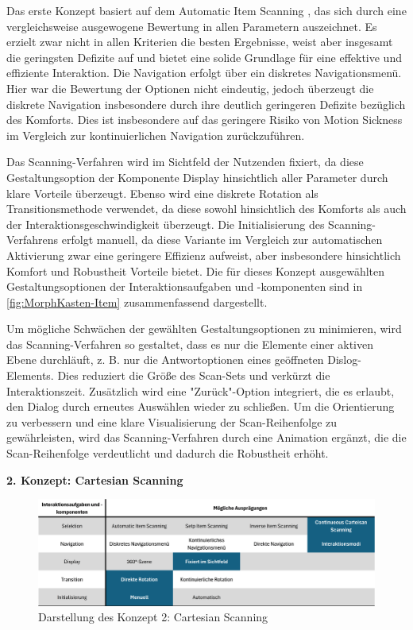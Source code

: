 Das erste Konzept basiert auf dem Automatic Item Scanning , das sich durch eine vergleichsweise ausgewogene Bewertung in allen Parametern auszeichnet. Es erzielt zwar nicht in allen Kriterien die besten Ergebnisse, weist aber insgesamt die geringsten Defizite auf und bietet eine solide Grundlage für eine effektive und effiziente Interaktion. Die Navigation erfolgt über ein diskretes Navigationsmenü. Hier war die Bewertung der Optionen nicht eindeutig, jedoch überzeugt die diskrete Navigation insbesondere durch ihre deutlich geringeren Defizite bezüglich des Komforts. Dies ist insbesondere auf das geringere Risiko von Motion Sickness im Vergleich zur kontinuierlichen Navigation zurückzuführen.

Das Scanning-Verfahren wird im Sichtfeld der Nutzenden fixiert, da diese Gestaltungsoption der Komponente Display hinsichtlich aller Parameter durch klare Vorteile überzeugt. Ebenso wird eine diskrete Rotation als Transitionsmethode verwendet, da diese sowohl hinsichtlich des Komforts als auch der Interaktionsgeschwindigkeit überzeugt. Die Initialisierung des Scanning-Verfahrens erfolgt manuell, da diese Variante im Vergleich zur automatischen Aktivierung zwar eine geringere Effizienz aufweist, aber insbesondere hinsichtlich Komfort und Robustheit Vorteile bietet.
Die für dieses Konzept ausgewählten Gestaltungsoptionen der Interaktionsaufgaben und -komponenten sind in \autoref{fig:MorphKasten-Item} zusammenfassend dargestellt.

Um mögliche Schwächen der gewählten Gestaltungsoptionen zu minimieren, wird das Scanning-Verfahren so gestaltet, dass es nur die Elemente einer aktiven Ebene durchläuft, z. B. nur die Antwortoptionen eines geöffneten Dislog-Elements. Dies reduziert die Größe des Scan-Sets und verkürzt die Interaktionszeit. Zusätzlich wird eine "Zurück"-Option integriert, die es erlaubt, den Dialog durch erneutes Auswählen wieder zu schließen. Um die Orientierung zu verbessern und eine klare Visualisierung der Scan-Reihenfolge zu gewährleisten, wird das Scanning-Verfahren durch eine Animation ergänzt, die die Scan-Reihenfolge verdeutlicht und dadurch die Robustheit erhöht.

{\normalfont \bfseries 2. Konzept: Cartesian Scanning}

\begin{figure}[tbh]
    \centering
    \includegraphics[width=1.0\textwidth]{images/MorphKasten-Cartesian.png}
    \caption{Darstellung des Konzept 2: Cartesian Scanning}
    \label{fig:MorphKasten-Cartesian}
\end{figure}

